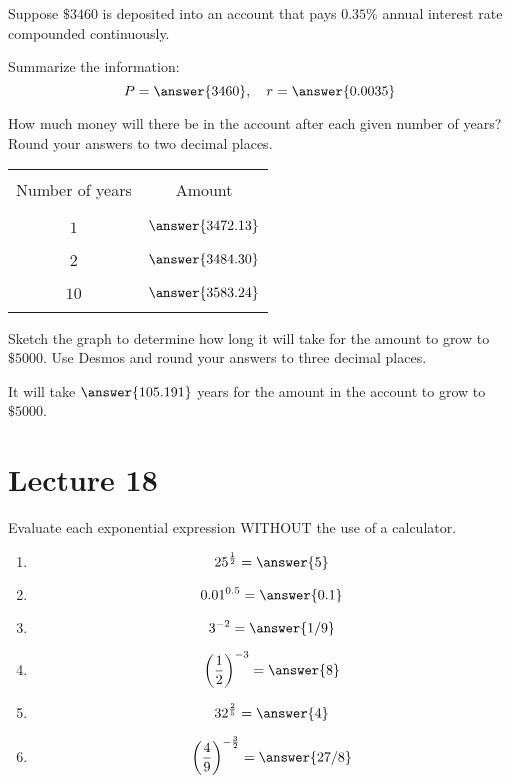 \documentclass{ximera}
\begin{document}
  \begin{problem}\label{prob:160hom7prob6}
  Suppose $\$3460$ is deposited into an account that pays $0.35\%$ annual interest rate compounded continuously.  
  
  Summarize the information:
  $$P=\answer{3460},\quad r=\answer{0.0035}$$
  
  How much money will there be in the account after each given number of years?  Round your answers to two decimal places.
  \begin{center}
\begin{tabular}{|c|c|}
 \hline
 &   \\
Number of years &  Amount \\
 &  \\
  \hline
  &  \\
 $1$ & $\answer{3472.13}$ \\
  & \\
 \hline
 &  \\
 $2$ & $\answer{3484.30}$ \\
  & \\
 \hline
 &  \\
 $10$ & $\answer{3583.24}$ \\
  & \\
 \hline
   \end{tabular}
\end{center}    
Sketch the graph to determine how long it will take for the amount to grow to  $\$5000$.  Use Desmos and round your answers to three decimal places.
  
  \begin{center}  
\end{center}

It will take $\answer{105.191}$ years for the amount in the account to grow to $\$5000$.  
  \end{problem}
 
 
 \section{Lecture 18}

\begin{problem}\label{prob:160hom7prob7}
Evaluate each exponential expression WITHOUT the use of a calculator.  
\begin{enumerate}
    \item $$25^{\frac{1}{2}}=\answer{5}$$
    \item $$0.01^{0.5}=\answer{0.1}$$
    \item $$3^{-2}=\answer{1/9}$$
    \item $$\left(\frac{1}{2}\right)^{-3}=\answer{8}$$
    \item $$32^{\frac{2}{5}}=\answer{4}$$
    \item $$\left(\frac{4}{9}\right)^{-\frac{3}{2}}=\answer{27/8}$$
\end{enumerate}
\end{problem}
\end{document}
